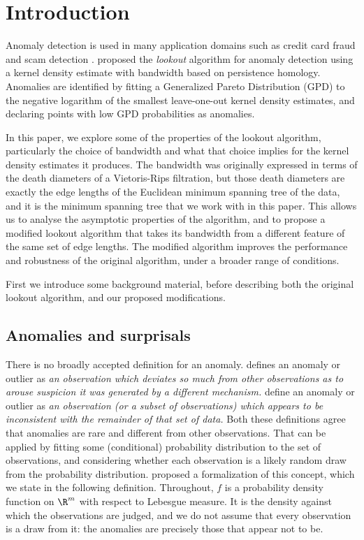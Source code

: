 \section{Introduction} \label{sec:intro}

Anomaly detection is used in many application domains such as credit card fraud and scam detection \citep{kolupuri2025scams}.  \cite{lookout} proposed the \textit{lookout} algorithm for anomaly detection using a kernel density estimate with bandwidth based on persistence homology. Anomalies are identified by fitting a Generalized Pareto Distribution (GPD) to the negative logarithm of the smallest leave-one-out kernel density estimates, and declaring points with low GPD probabilities as anomalies.

In this paper, we explore some of the properties of the lookout algorithm, particularly the choice of bandwidth and what that choice implies for the kernel density estimates it produces. The bandwidth was originally expressed in terms of the death diameters of a Vietoris-Rips filtration, but those death diameters are exactly the edge lengths of the Euclidean minimum spanning tree of the data, and it is the minimum spanning tree that we work with in this paper. This allows us to analyse the asymptotic properties of the algorithm, and to propose a modified lookout algorithm that takes its bandwidth from a different feature of the same set of edge lengths. The modified algorithm improves the performance and robustness of the original algorithm, under a broader range of conditions.

First we introduce some background material, before describing both the original lookout algorithm, and our proposed modifications.

\subsection{Anomalies and surprisals}

There is no broadly accepted definition for an anomaly. \citet{hawkins1980identification} defines an anomaly or outlier as \textit{an observation which deviates so much from other observations as to arouse suspicion it was generated by a different mechanism.} \citet{Barnett1978} define an anomaly or outlier as \textit{an observation (or a subset of observations) which appears to be inconsistent with the remainder of that set of data.} Both these definitions agree that anomalies are rare and different from other observations. That can be applied by fitting some (conditional) probability distribution to the set of observations, and considering whether each observation is a likely random draw from the probability distribution. \citet{surprisals} proposed a formalization of this concept, which we state in the following definition. Throughout, $f$ is a probability density function on $\R^m$ with respect to Lebesgue measure. It is the density against which the observations are judged, and we do not assume that every observation is a draw from it: the anomalies are precisely those that appear not to be.

